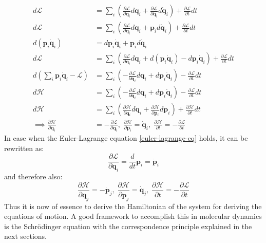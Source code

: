 \documentclass[12pt]{scrartcl}
\begin{document}
\begin{align*}
d\mathcal{L} &= \sum_{i} \left(  \frac{\partial \mathcal{L}}{\partial \mathbf{q}_i}d\mathbf{q}_i + \frac{\partial \mathcal{L}}{\partial \dot{\mathbf{q}}_i}d\dot{\mathbf{q}}_i  \right) + \frac{\partial \mathcal{L}}{\partial t} dt\\
d\mathcal{L} &= \sum_{i} \left(  \frac{\partial \mathcal{L}}{\partial \mathbf{q}_i}d\mathbf{q}_i + \mathbf{p}_id\dot{\mathbf{q}}_i  \right) + \frac{\partial \mathcal{L}}{\partial t} dt\\
d(\mathbf{p}_i\dot{\mathbf{q}}_i) &= d\mathbf{p}_i\dot{\mathbf{q}}_i+ \mathbf{p}_id\dot{\mathbf{q}}_i\\
d\mathcal{L} &= \sum_{i} \left(  \frac{\partial \mathcal{L}}{\partial \mathbf{q}_i}d\mathbf{q}_i +d(\mathbf{p}_i\dot{\mathbf{q}}_i) -  d\mathbf{p}_i\dot{\mathbf{q}}_i \right) + \frac{\partial \mathcal{L}}{\partial t} dt\\
d(\sum_{i} \mathbf{p}_i\dot{\mathbf{q}}_i - \mathcal{L})&=\sum_{i}\left(-\frac{\partial \mathcal{L}}{\partial \mathbf{q}_i}d\mathbf{q}_i +d\mathbf{p}_i\dot{\mathbf{q}}_i  \right)-\frac{\partial \mathcal{L}}{\partial t} dt \\
d\mathcal{H}&=\sum_{i}\left(-\frac{\partial \mathcal{L}}{\partial \mathbf{q}_i}d\mathbf{q}_i +d\mathbf{p}_i\dot{\mathbf{q}}_i  \right)-\frac{\partial \mathcal{L}}{\partial t} dt \\
d\mathcal{H}&=\sum_{i} \left(  \frac{\partial \mathcal{H}}{\partial \mathbf{q}_i}d\mathbf{q}_i + \frac{\partial \mathcal{H}}{\partial \mathbf{p}_i}d\mathbf{p}_i  \right) + \frac{\partial \mathcal{H}}{\partial t} dt\\
\implies \frac{\partial \mathcal{H}}{\partial \mathbf{q}_i}&=-\frac{\partial \mathcal{L}}{\partial \mathbf{q}_i},\;
\frac{\partial \mathcal{H}}{\partial \mathbf{p}_i}=\dot{\mathbf{q}}_i,\;
\frac{\partial \mathcal{H}}{\partial t}=-\frac{\partial \mathcal{L}}{\partial t}
\end{align*}
In case when the Euler-Lagrange equation \ref{euler-lagrange-eq} holds, it can be rewritten as:
\begin{equation}
\frac{\partial \mathcal{L}}{\partial \mathbf{q}_i} = \frac{d}{dt}\mathbf{p}_i=\dot{\mathbf{p}}_i
\end{equation}
and therefore also:
\begin{equation}
\frac{\partial \mathcal{H}}{\partial \mathbf{q}_j}=-\dot{\mathbf{p}}_j,\;\frac{\partial \mathcal{H}}{\partial \mathbf{p}_j}=\dot{\mathbf{q}}_j,\;\frac{\partial \mathcal{H}}{\partial t}=-\frac{\partial \mathcal{L}}{\partial t}
\end{equation}
Thus it is now of essence to derive the Hamiltonian of the system for deriving the equations of motion. A good framework to accomplish  this in molecular dynamics is the Schr\"odinger equation with the correspondence principle explained in the next sections.
\end{document}
